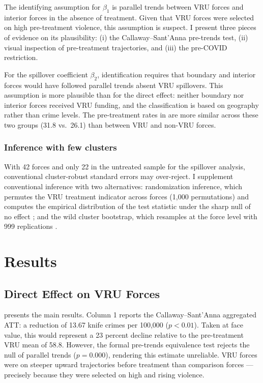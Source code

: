 \documentclass[12pt]{article}
\begin{document}
The identifying assumption for $\beta_1$ is parallel trends between VRU forces and interior forces in the absence of treatment. Given that VRU forces were selected on high pre-treatment violence, this assumption is suspect. I present three pieces of evidence on its plausibility: (i) the Callaway--Sant'Anna pre-trends test, (ii) visual inspection of pre-treatment trajectories, and (iii) the pre-COVID restriction.

For the spillover coefficient $\beta_2$, identification requires that boundary and interior forces would have followed parallel trends absent VRU spillovers. This assumption is more plausible than for the direct effect: neither boundary nor interior forces received VRU funding, and the classification is based on geography rather than crime levels. The pre-treatment rates in  are more similar across these two groups (31.8 vs.\ 26.1) than between VRU and non-VRU forces.

\subsubsection*{Inference with few clusters} With 42 forces and only 22 in the untreated sample for the spillover analysis, conventional cluster-robust standard errors may over-reject. I supplement conventional inference with two alternatives: randomization inference, which permutes the VRU treatment indicator across forces (1,000 permutations) and computes the empirical distribution of the test statistic under the sharp null of no effect \citep{fisher1935design, young2019channeling}; and the wild cluster bootstrap, which resamples at the force level with 999 replications \citep{cameron2008bootstrap, roodman2019fast}.


\section{Results}
\label{sec:results}

\subsection{Direct Effect on VRU Forces}

 presents the main results. Column 1 reports the Callaway--Sant'Anna aggregated ATT: a reduction of 13.67 knife crimes per 100,000 ($p < 0.01$). Taken at face value, this would represent a 23 percent decline relative to the pre-treatment VRU mean of 58.8. However, the formal pre-trends equivalence test rejects the null of parallel trends ($p = 0.000$), rendering this estimate unreliable. VRU forces were on steeper upward trajectories before treatment than comparison forces --- precisely because they were selected on high and rising violence.
\end{document}
